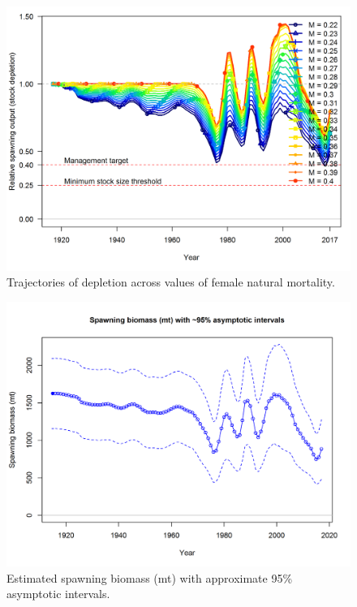 \documentclass[12pt,]{article}
\begin{document}
\begin{figure}[htbp]
\centering
\includegraphics{Figures/profile_m_depl.png}
\caption{Trajectories of depletion across values of female natural
mortality. \label{fig:profile_m_depl}}
\end{figure}

\FloatBarrier

\begin{figure}[htbp]
\centering
\includegraphics{r4ss/plots_mod1/ts7_Spawning_biomass_(mt)_with_95_asymptotic_intervals_intervals.png}
\caption{Estimated spawning biomass (mt) with approximate 95\%
asymptotic intervals.
\label{fig:ts7_Spawning_biomass_(mt)_with_95_asymptotic_intervals_intervals}}
\end{figure}
\end{document}
